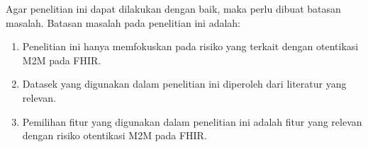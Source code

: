 Agar penelitian ini dapat dilakukan dengan baik, maka perlu dibuat batasan masalah. Batasan masalah pada penelitian ini adalah:

\begin{enumerate}
    \item Penelitian ini hanya memfokuskan pada risiko yang terkait dengan otentikasi M2M pada FHIR.
    \item Datasek yang digunakan dalam penelitian ini diperoleh dari literatur yang relevan.
    \item Pemilihan fitur yang digunakan dalam penelitian ini adalah fitur yang relevan dengan risiko otentikasi M2M pada FHIR.
\end{enumerate}